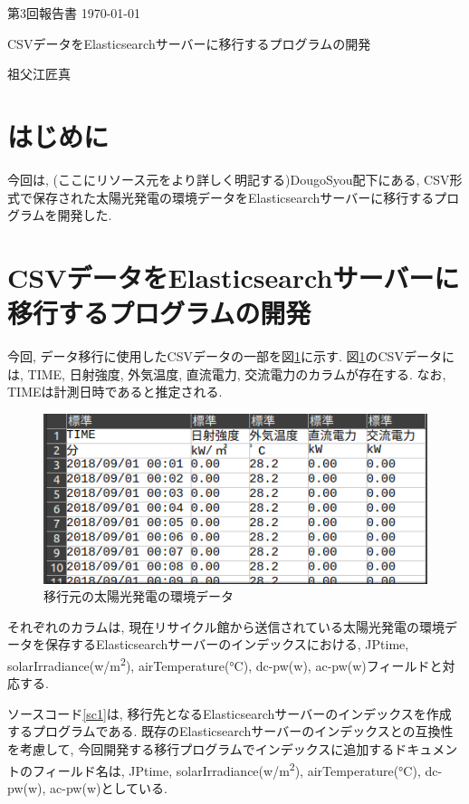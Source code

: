 \documentclass[a4j,12pt,]{jarticle}
\begin{document}
{\noindent\small 第3回報告書 \hfill\today}
\begin{center}
  {\Large CSVデータをElasticsearchサーバーに移行するプログラムの開発}
\end{center}
\begin{flushright}
  祖父江匠真 \\
\end{flushright}

\section{はじめに}
今回は, (ここにリソース元をより詳しく明記する)DougoSyou配下にある, CSV形式で保存された太陽光発電の環境データをElasticsearchサーバーに移行するプログラムを開発した.

\section{CSVデータをElasticsearchサーバーに移行するプログラムの開発}
今回, データ移行に使用したCSVデータの一部を図\ref{p1}に示す.
図\ref{p1}のCSVデータには, TIME, 日射強度, 外気温度, 直流電力, 交流電力のカラムが存在する.
なお, TIMEは計測日時であると推定される.

\begin{figure}[H]
  \begin{center}
    \includegraphics[width=160mm]{csv.png}
    \caption{移行元の太陽光発電の環境データ}
    \label{p1}
  \end{center}
\end{figure}

それぞれのカラムは, 現在リサイクル館から送信されている太陽光発電の環境データを保存するElasticsearchサーバーのインデックスにおける, JPtime, solarIrradiance(\si{\kilo}w/\si{\metre\squared}), airTemperature(\si{\degreeCelsius}), dc-pw(\si{\kilo}w), ac-pw(\si{\kilo}w)フィールドと対応する.

ソースコード\ref{sc1}は, 移行先となるElasticsearchサーバーのインデックスを作成するプログラムである.
既存のElasticsearchサーバーのインデックスとの互換性を考慮して, 今回開発する移行プログラムでインデックスに追加するドキュメントのフィールド名は, JPtime, solarIrradiance(\si{\kilo}w/\si{\metre\squared}), airTemperature(\si{\degreeCelsius}), dc-pw(\si{\kilo}w), ac-pw(\si{\kilo}w)としている.
\end{document}

